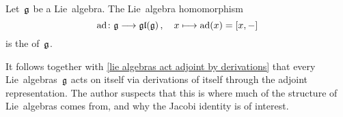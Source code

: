 \begin{definition}
  Let~$\mathfrak{g}$ be a Lie~algebra.
  The  Lie~algebra homomorphism
  \[
    \ad
    \colon
    \glie
    \to
    \gllie(\glie) \,,
    \quad
    x
    \mapsto
    \ad(x)
    =
    [x,-]
  \]
  is the  of~$\mathfrak{g}$.
\end{definition}


\begin{remark}
  It follows together with \cref{lie algebras act adjoint by derivations} that every Lie~algebras~$\mathfrak{g}$ acts on itself via derivations of itself through the adjoint representation.
  The author suspects that this is where much of the structure of Lie~algebras comes from, and why the Jacobi identity is of interest.
\end{remark}


